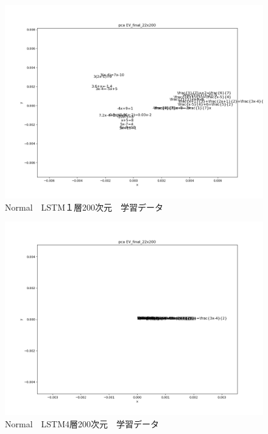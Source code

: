\documentclass[a4j,11pt,report]{jsbook}
\begin{document}
\begin{center}
  \begin{figure}[tb]
    \centering
    \includegraphics[width=0.7\linewidth]{result/pca_formula_EV_final_22x200_1_Wed_Feb_06_06:17:39.png}
    \caption{Normal　LSTM１層200次元　学習データ}
    \label{fig:Simple1_200}
  \end{figure}
\end{center}


\begin{center}
  \begin{figure}[tb]
    \centering
    \includegraphics[width=0.7\linewidth]{result/pca_formula_EV_final_22x200_4_Wed_Feb_06_06:19:53.png}
    \caption{Normal　LSTM4層200次元　学習データ}
    \label{fig:Simple4_200}
  \end{figure}
\end{center}
\end{document}
